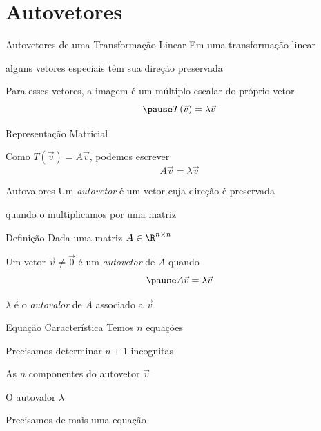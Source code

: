 \documentclass[fleqn,aspectratio=169,12pt]{beamer}
\begin{document}



\section{Autovetores}

\begin{frame}{Autovetores de uma Transformação Linear}
  Em uma transformação linear

  \pause
  alguns vetores especiais têm sua direção preservada

  \pause
  Para esses vetores, a imagem é um múltiplo escalar do próprio vetor
  \[
    \pause
    T(\vec{v}) = \lambda\vec{v}
  \]

  \pause
  Representação Matricial

  \pause
  Como \(T(\vec{v}) = A\vec{v}\),
  \pause
  podemos escrever
  \[
    A\vec{v} = \lambda\vec{v}
  \]
\end{frame}

\begin{frame}{Autovalores}
  Um \emph{autovetor} é um vetor cuja direção é preservada

  \pause
  quando o multiplicamos por uma matriz
\end{frame}

\begin{frame}{Definição}
  Dada uma matriz \(A\in\R^{n\times n}\)

  \pause
  \bigskip
  Um vetor \(\vec{v}\neq\vec{0}\) é um \emph{autovetor} de \(A\) quando
  \[
    \pause
    A\vec{v} = \lambda\vec{v}
  \]

  \pause
  \medskip
  \(\lambda\) é o \emph{autovalor} de \(A\) associado a \(\vec{v}\)
\end{frame}

\begin{frame}{Equação Característica}
  Temos $n$ equações

  \pause
  \bigskip
  Precisamos determinar $n+1$ incognitas

  \pause
  \qquad As $n$ componentes do autovetor $\vec{v}$

  \pause
  \qquad O autovalor $\lambda$

  \pause
  \bigskip
  Precisamos de mais uma equação
\end{frame}
\end{document}

